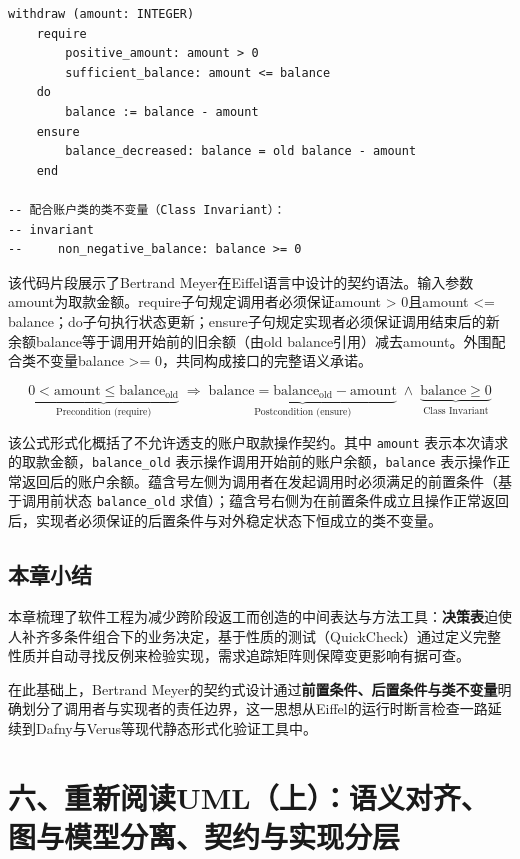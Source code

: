\documentclass[UTF8,a4paper,11pt,fontset=fandol]{ctexart}
\begin{document}
\begin{lstlisting}[basicstyle={\ttfamily\small\linespread{1}\selectfont},captionpos=t,caption={Eiffel风格的账户取款契约定义}]
withdraw (amount: INTEGER)
    require
        positive_amount: amount > 0
        sufficient_balance: amount <= balance
    do
        balance := balance - amount
    ensure
        balance_decreased: balance = old balance - amount
    end

-- 配合账户类的类不变量（Class Invariant）：
-- invariant
--     non_negative_balance: balance >= 0
\end{lstlisting}

该代码片段展示了Bertrand Meyer在Eiffel语言中设计的契约语法。输入参数amount为取款金额。require子句规定调用者必须保证amount > 0且amount <= balance；do子句执行状态更新；ensure子句规定实现者必须保证调用结束后的新余额balance等于调用开始前的旧余额（由old balance引用）减去amount。外围配合类不变量balance >= 0，共同构成接口的完整语义承诺。

\[
\underbrace{0 < \mathrm{amount} \le \mathrm{balance}_{\mathrm{old}}}_{\text{Precondition (require)}} \;\Longrightarrow\; \underbrace{\mathrm{balance} = \mathrm{balance}_{\mathrm{old}} - \mathrm{amount}}_{\text{Postcondition (ensure)}} \;\wedge\; \underbrace{\mathrm{balance} \ge 0}_{\text{Class Invariant}}
\]

该公式形式化概括了不允许透支的账户取款操作契约。其中 \texttt{amount} 表示本次请求的取款金额，\texttt{balance\_old} 表示操作调用开始前的账户余额，\texttt{balance} 表示操作正常返回后的账户余额。蕴含号左侧为调用者在发起调用时必须满足的前置条件（基于调用前状态 \texttt{balance\_old} 求值）；蕴含号右侧为在前置条件成立且操作正常返回后，实现者必须保证的后置条件与对外稳定状态下恒成立的类不变量。

\subsection{本章小结}

本章梳理了软件工程为减少跨阶段返工而创造的中间表达与方法工具：\textbf{决策表}迫使人补齐多条件组合下的业务决定，基于性质的测试（QuickCheck）通过定义完整性质并自动寻找反例来检验实现，需求追踪矩阵则保障变更影响有据可查。

在此基础上，Bertrand Meyer的契约式设计通过\textbf{前置条件、后置条件与类不变量}明确划分了调用者与实现者的责任边界，这一思想从Eiffel的运行时断言检查一路延续到Dafny与Verus等现代静态形式化验证工具中。

\section{六、重新阅读UML（上）：语义对齐、图与模型分离、契约与实现分层}
\end{document}

